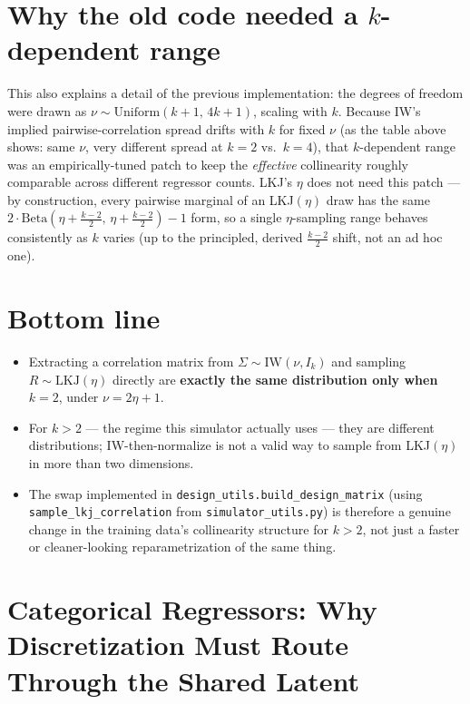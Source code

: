 \documentclass[11pt]{article}
\newcommand{\IW}{\mathrm{IW}}
\newcommand{\LKJ}{\mathrm{LKJ}}
\begin{document}
\section*{Why the old code needed a $k$-dependent range}

This also explains a detail of the previous implementation: the degrees of
freedom were drawn as $\nu \sim \mathrm{Uniform}(k+1,\, 4k+1)$, scaling with
$k$. Because IW's implied pairwise-correlation spread drifts with $k$ for
fixed $\nu$ (as the table above shows: same $\nu$, very different spread at
$k=2$ vs.\ $k=4$), that $k$-dependent range was an empirically-tuned patch to
keep the \emph{effective} collinearity roughly comparable across different
regressor counts. LKJ's $\eta$ does not need this patch --- by construction,
every pairwise marginal of an LKJ$(\eta)$ draw has the same
$2\cdot\mathrm{Beta}(\eta+\tfrac{k-2}{2},\,\eta+\tfrac{k-2}{2})-1$ form, so a
single $\eta$-sampling range behaves consistently as $k$ varies (up to the
principled, derived $\tfrac{k-2}{2}$ shift, not an ad hoc one).

\section*{Bottom line}

\begin{itemize}
  \item Extracting a correlation matrix from $\Sigma \sim \IW(\nu, I_k)$ and
    sampling $R \sim \LKJ(\eta)$ directly are \textbf{exactly the same
    distribution only when $k=2$}, under $\nu = 2\eta+1$.
  \item For $k>2$ --- the regime this simulator actually uses --- they are
    different distributions; IW-then-normalize is not a valid way to sample
    from LKJ$(\eta)$ in more than two dimensions.
  \item The swap implemented in \texttt{design\_utils.build\_design\_matrix}
    (using \texttt{sample\_lkj\_correlation} from
    \texttt{simulator\_utils.py}) is therefore a genuine change in the
    training data's collinearity structure for $k>2$, not just a faster
    or cleaner-looking reparametrization of the same thing.
\end{itemize}

\appendix
\section{Categorical Regressors: Why Discretization Must Route Through the Shared Latent}
\end{document}
